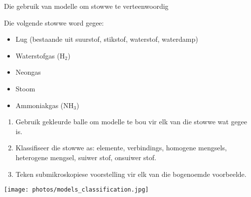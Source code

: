   \label{m38708*eip-326} \vspace{-.5cm}
\begin{activity}{Die gebruik van modelle om stowwe te verteenwoordig}{

Die volgende stowwe word gegee:
\label{m38708*eip-id1166921187210}
\begin{itemize}[noitemsep]
\item Lug (bestaande uit suurstof, stikstof, waterstof, waterdamp)
\item Waterstofgas ($\text{H}_{2}$)
\item Neongas
\item Stoom
\item Ammoniakgas ($\text{NH}_{3}$)
\end{itemize}
\begin{minipage}{.5\textwidth}
 \noindent
\begin{enumerate}[noitemsep, label=\textbf{\arabic*}.]
\item Gebruik gekleurde balle om modelle te bou vir elk van die stowwe wat gegee is.
\item Klassifiseer die stowwe as: elemente, verbindings, homogene mengsels, heterogene mengsel, suiwer stof, onsuiwer stof.
\item Teken submikroskopiese voorstelling vir elk van die bogenoemde voorbeelde.
\end{enumerate}
\end{minipage}
\begin{minipage}{.5\textwidth}
\begin{center}
 \texttt{[image: photos/models\_classification.jpg]}\par
\end{center}
\end{minipage}
}
\end{activity}
\vspace{-.5cm}
\label{m38708*secfhsst!!!underscore!!!id212}
